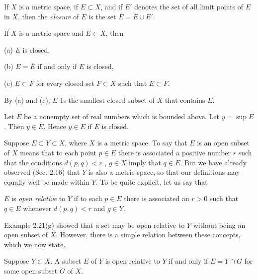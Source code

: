 \begin{myDefinition}\label{myDefinition:2..26 closure}
    If $X$ is a metric space, if $E \subset X$, and if $E'$ denotes the set of all limit points of $E$ in $X$, then the \emph{closure} of $E$ is the set $\bar{E}=E \cup E'$.
\end{myDefinition}

\begin{thm}
    If $X$ is a metric space and $E \subset X$, then
    
    (a) $E$ is closed,
    
    (b) $E = \bar{E}$ if and only if $E$ is closed,
    
    (c) $E \subset F$ for every closed set $F \subset X$ such that $E \subset F$.
\end{thm}
By (a) and (c), $E$ 1s the smallest closed subset of $X$ that contains $E$.

\begin{thm}
    Let $E$ be a nonempty set of real numbers which is bounded above.     Let $y = \sup E$. Then $y \in \bar{E}$. Hence $y \in E$ if $E$ is closed.
\end{thm}

\begin{myRemark}
    Suppose $E \subset Y \subset X$, where $X$ is a metric space. To say that $E$ is an open subset of $X$ means that to each point $p \in E$ there is associated a positive number $r$ such that the conditions $d(p,q) < r$ , $g \in X$ imply that $q \in E$. But we have already observed (Sec. 2.16) that $Y$ is also a metric space, so that our definitions may equally well be made within $Y$. To be quite explicit, let us say that 
    
    $E$ is \emph{open relative} to $Y$ if to each $p \in E$ there is associated an $r > 0$ such that $q \in E$ whenever $d(p,q) <r$ and $g \in Y$. 
    
    Example 2.21(g) showed that a set may be open relative to $Y$ without being an open subset of $X$. However, there is a simple relation between these concepts, which we now state.
\end{myRemark}

\begin{thm}
    Suppose $Y \subset X$. A subset $E$ of $Y$ is open relative to $Y$ if and only if $E = Y \cap G$ for some open subset $G$ of $X$.
\end{thm}
